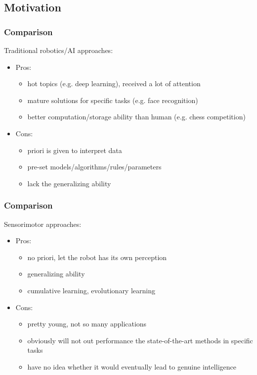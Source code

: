 \documentclass{beamer}
\begin{document}
\subsection{Motivation}
\begin{frame}
\frametitle{Comparison}



Traditional robotics/AI approaches:
\begin{itemize}
\item Pros:
		\begin{itemize}
		\item hot topics (e.g. deep learning), received a lot of attention 
		\item mature solutions for specific tasks (e.g. face recognition)
		\item better computation/storage ability than human (e.g. chess competition)
		\end{itemize}
\item Cons:
		\begin{itemize}
		\item	priori is given to interpret data
		\item	pre-set models/algorithms/rules/parameters 
		\item	lack the generalizing ability 
		\end{itemize}
\end{itemize}


\end{frame}



\begin{frame}
\frametitle{Comparison}
Sensorimotor approaches:
\begin{itemize}
\item Pros:
		\begin{itemize}
		\item no priori, let the robot has its own perception
		\item generalizing ability 
		\item cumulative learning, evolutionary learning
		\end{itemize}
\item Cons:
		\begin{itemize}
		\item pretty young, not so many applications
		\item obviously will not out performance the state-of-the-art methods in specific tasks 
		\item have no idea whether it would eventually lead to genuine intelligence 
		\end{itemize}
\end{itemize}



\end{frame}
\end{document}
